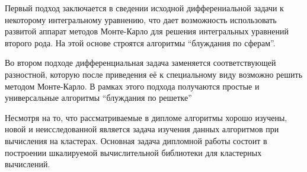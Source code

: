 Первый подход заключается в сведении исходной дифферениальной задачи к некоторому интегральному уравнению, что дает возможность использовать развитой аппарат методов Монте-Карло для решения интегральных уравнений второго рода. На этой основе строятся алгоритмы ``блуждания по сферам''.
   
Во втором подходе дифференциальная задача заменяется соответствующей разностной,
которую после приведения её к специальному виду возможно решить
методом Монте-Карло. В рамках этого подхода получаются простые и универсальные алгоритмы ``блуждания по решетке''

Несмотря на то, что рассматриваемые в дипломе алгоритмы хорошо изучены, новой и неисследованной является задача изучения данных алгоритмов при вычисления на кластерах. Основная задача дипломной работы состоит в  построении шкалируемой вычислительной библиотеки для кластерных вычислений.  












